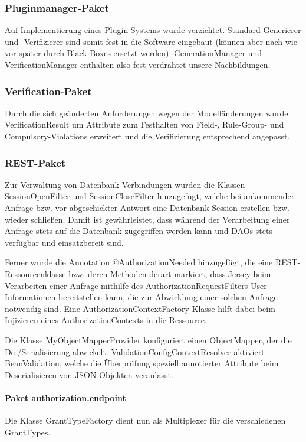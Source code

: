 \subsubsection{Pluginmanager-Paket}

Auf Implementierung eines Plugin-Systems wurde verzichtet.
Standard-Generierer und -Verifizierer sind somit fest in die Software eingebaut (können aber nach wie vor später durch Black-Boxes ersetzt werden). GenerationManager und VerificationManager enthalten also fest verdrahtet unsere Nachbildungen.


\subsubsection{Verification-Paket}

Durch die sich geänderten Anforderungen wegen der Modelländerungen wurde VerificationResult um Attribute zum Festhalten von Field-, Rule-Group- und Compulsory-Violations erweitert und die Verifizierung entsprechend angepasst.


\subsubsection{REST-Paket}

Zur Verwaltung von Datenbank-Verbindungen wurden die Klassen SessionOpenFilter und SessionCloseFilter hinzugefügt, welche bei ankommender Anfrage bzw. vor abgeschickter Antwort eine Datenbank-Session erstellen bzw. wieder schließen. Damit ist gewährleistet, dass während der Verarbeitung einer Anfrage stets auf die Datenbank zugegriffen werden kann und DAOs stets verfügbar und einsatzbereit sind.

Ferner wurde die Annotation @AuthorizationNeeded hinzugefügt, die eine REST-Ressourcenklasse bzw. deren Methoden derart markiert, dass Jersey beim Verarbeiten einer Anfrage mithilfe des AuthorizationRequestFilters User-Informationen bereitstellen kann, die zur Abwicklung einer solchen Anfrage notwendig sind. Eine AuthorizationContextFactory-Klasse hilft dabei beim Injizieren eines AuthorizationContexts in die Ressource.

Die Klasse MyObjectMapperProvider konfiguriert einen ObjectMapper, der die De-/Serialisierung abwickelt. ValidationConfigContextResolver aktiviert BeanValidation, welche die Überprüfung speziell annotierter Attribute beim Deserialisieren von JSON-Objekten veranlasst.


\paragraph{Paket authorization.endpoint} Die Klasse GrantTypeFactory dient nun als Multiplexer für die verschiedenen GrantTypes.


